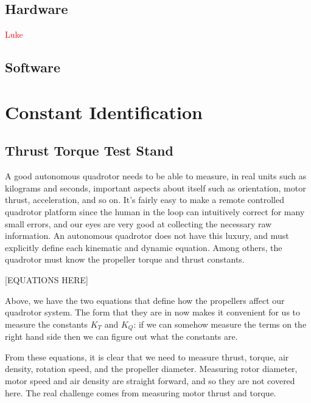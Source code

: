 \documentclass{article}
\numberwithin{equation}{section} %
\begin{document}
\subsection{Hardware}
\textcolor{red}{Luke}

\subsection{Software}



\section{Constant Identification}

\subsection{Thrust Torque Test Stand}

A good autonomous quadrotor needs to be able to measure, in real units such as kilograms and seconds, important aspects about itself such as orientation, motor thrust, acceleration, and so on. It's fairly easy to make a remote controlled quadrotor platform since the human in the loop can intuitively correct for many small errors, and our eyes are very good at collecting the necessary raw information. An autonomous quadrotor does not have this luxury, and must explicitly define each kinematic and dynamic equation. Among others, the quadrotor must know the propeller torque and thrust constants. 

[EQUATIONS HERE]

Above, we have the two equations that define how the propellers affect our quadrotor system. The form that they are in now makes it convenient for us to measure the constants $K_T$ and $K_Q$: if we can somehow measure the terms on the right hand side then we can figure out what the constants are.

From these equations, it is clear that we need to measure thrust, torque, air density, rotation speed, and the propeller diameter. Measuring rotor diameter, motor speed and air density are straight forward, and so they are not covered here. The real challenge comes from measuring motor thrust and torque.
\end{document}
